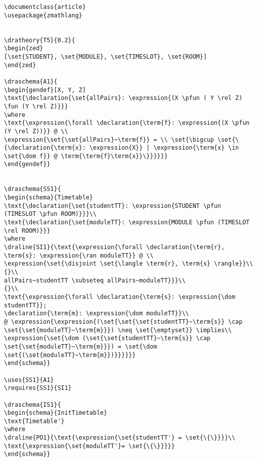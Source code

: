 \begin{verbatim}
\documentclass{article}
\usepackage{zmathlang}


\dratheory{T5}{0.2}{
\begin{zed}
[\set{STUDENT}, \set{MODULE}, \set{TIMESLOT}, \set{ROOM}]
\end{zed}

\draschema{A1}{
\begin{gendef}[X, Y, Z]
\text{\declaration{\set{allPairs}: \expression{(X \pfun ( Y \rel Z) \fun (Y \rel Z)}}}
\where
\text{\expression{\forall \declaration{\term{f}: \expression{(X \pfun (Y \rel Z))}} @ \\
\expression{\set{\set{allPairs}~\term{f}} = \\ \set{\bigcup \set{\{\declaration{\term{x}: \expression{X}} | \expression{\term{x} \in \set{\dom f}} @ \term{\term{f}\term{x}}\}}}}}}
\end{gendef}}


\draschema{SS1}{
\begin{schema}{Timetable}
\text{\declaration{\set{studentTT}: \expression{STUDENT \pfun (TIMESLOT \pfun ROOM)}}}\\
\text{\declaration{\set{moduleTT}: \expression{MODULE \pfun (TIMESLOT \rel ROOM)}}}
\where
\draline{SI1}{\text{\expression{\forall \declaration{\term{r}, \term{s}: \expression{\ran moduleTT}} @ \\
\expression{\set{\disjoint \set{\langle \term{r}, \term{s} \rangle}}\\
{}\\
allPairs~studentTT \subseteq allPairs~moduleTT}}}\\
{}\\
\text{\expression{\forall \declaration{\term{s}: \expression{\dom studentTT}}; 
\declaration{\term{m}: \expression{\dom moduleTT}}\\
@ \expression{\expression{(\set{\set{\set{studentTT}~\term{s}} \cap \set{\set{moduleTT}~\term{m}}}) \neq \set{\emptyset}} \implies\\
\expression{\set{\dom (\set{\set{studentTT}~\term{s}} \cap \set{\set{moduleTT}~\term{m}}}) = \set{\dom \set{(\set{moduleTT}~\term{m}})}}}}}}
\end{schema}}

\uses{SS1}{A1}
\requires{SS1}{SI1}

\draschema{IS1}{
\begin{schema}{InitTimetable}
\text{Timetable'}
\where
\draline{PO1}{\text{\expression{\set{studentTT'} = \set{\{\}}}}\\
\text{\expression{\set{moduleTT'}= \set{\{\}}}}}
\end{schema}}


\end{verbatim}
